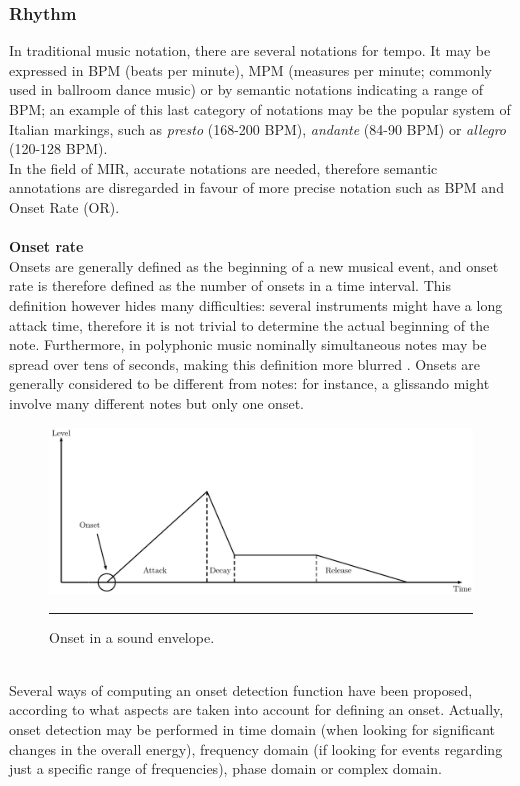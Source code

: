 \subsubsection{Rhythm}
In traditional music notation, there are several notations for tempo. It may be expressed in BPM (beats per minute), MPM (measures per minute; commonly used in ballroom dance music) or by semantic notations indicating a range of BPM; an example of this last category of notations may be the popular system of Italian markings, such as \textit{presto} (168-200 BPM), \textit{andante} (84-90 BPM) or \textit{allegro} (120-128 BPM). \\ In the field of MIR, accurate notations are needed, therefore semantic annotations are disregarded in favour of more precise notation such as BPM and Onset Rate (OR).
\\ \\ 
\textbf{Onset rate} \\ 
Onsets are generally defined as the beginning of a new musical event, and onset rate is therefore defined as the number of onsets in a time interval. This definition however hides many difficulties: several instruments might have a long attack time, therefore it is not trivial to determine the actual beginning of the note. Furthermore, in polyphonic music nominally simultaneous notes may be spread over tens of seconds, making this definition more blurred \cite{dixon06}. Onsets are generally considered to be different from notes: for instance, a glissando might involve many different notes but only one onset.
\begin{figure}[h]
\begin{center}
\includegraphics[scale=0.75]{Figures/onsets.pdf}
    \rule{20em}{0.5pt}
  \caption[Onset and sound envelope]{Onset in a sound envelope.}
  \label{fig:Onsets}
\end{center}
\end{figure} \\
Several ways of computing an onset detection function have been proposed, according to what aspects are taken into account for defining an onset. Actually, onset detection may be performed in time domain (when looking for significant changes in the overall energy), frequency domain (if looking for events regarding just a specific range of frequencies), phase domain or complex domain. 
